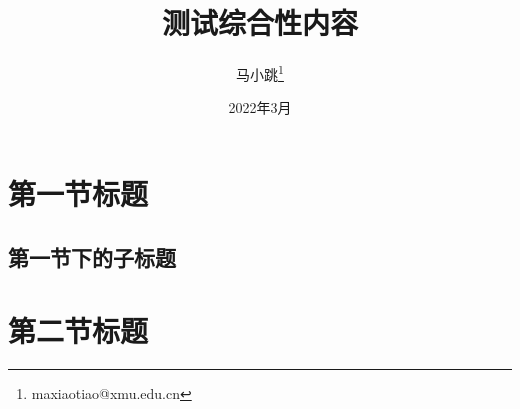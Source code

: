 \documentclass[UTF8]{ctexart} %
\title{测试综合性内容}  %
\author{马小跳\thanks{maxiaotiao@xmu.edu.cn}}  %
\date{2022年3月}  %
\begin{document}

\maketitle  %

\section{第一节标题}  %

\lipsum[1-2]  %

\subsection{第一节下的子标题} %
\zhlipsum[3-4] %

\section{第二节标题}
\lipsum[1-4][2-5] %
\end{document}
